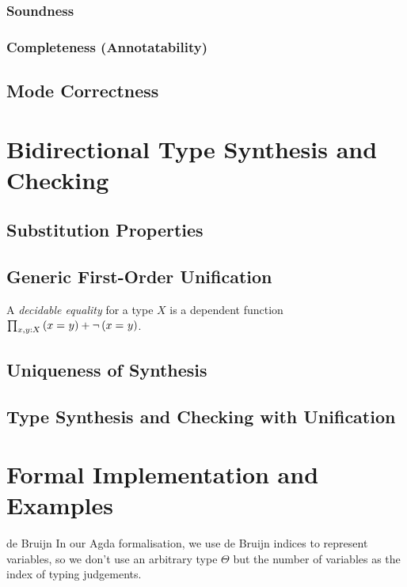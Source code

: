 \documentclass[acmsmall,screen]{acmart}
\theoremstyle{acmdefinition}
\begin{document}
\subsubsection{Soundness}
\subsubsection{Completeness (Annotatability)}
\subsection{Mode Correctness}

\section{Bidirectional Type Synthesis and Checking}

\subsection{Substitution Properties}
\subsection{Generic First-Order Unification}
\cite{McBride2003,McBride2003a}
\begin{definition}
A \emph{decidable equality} for a type $X$ is a dependent function $\prod_{x, y : X} \left(x =_{} y\right) + \neg \left(x =_{} y\right)$.
\end{definition}
 
\subsection{Uniqueness of Synthesis}

\subsection{Type Synthesis and Checking with Unification}

\section{Formal Implementation and Examples}
\begin{LTannote}{de Bruijn}
  In our Agda formalisation, we use de Bruijn indices to represent variables, so we don't use an arbitrary type $\Theta$ but the number of variables as the index of typing judgements.
\end{LTannote}
\end{document}
